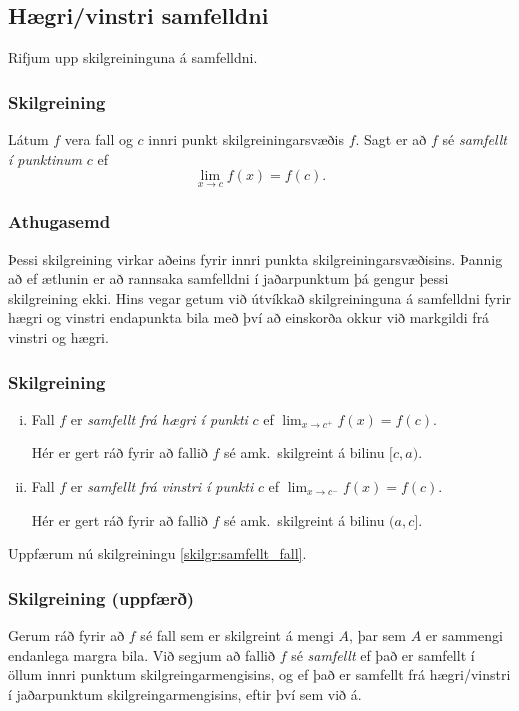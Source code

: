 \documentclass[icelandic,a4paper,12pt]{article}
\begin{document}
\subsection{Hægri/vinstri samfelldni}	
Rifjum upp skilgreininguna á samfelldni.
\subsubsection{Skilgreining}
Látum $f$ vera fall og $c$ innri punkt skilgreiningarsvæðis $f$.  Sagt
er að $f$ sé \emph{samfellt í punktinum} $c$ ef
$$\lim_{x\rightarrow c}f(x)=f(c).$$
 
\pause
\subsubsection{Athugasemd}
Þessi skilgreining virkar aðeins fyrir innri punkta skilgreiningarsvæðisins.
Þannig að ef ætlunin er að rannsaka samfelldni í jaðarpunktum þá gengur
þessi skilgreining ekki. Hins vegar getum við útvíkkað skilgreininguna á samfelldni fyrir 
hægri og vinstri endapunkta bila með því að einskorða okkur
við markgildi frá vinstri og hægri.

\subsubsection{Skilgreining}
\begin{enumerate}[(i)]
\item Fall $f$ er \emph{samfellt frá hægri í punkti} $c$ ef
$\lim_{x\rightarrow c^+}f(x)=f(c)$.
  
Hér er gert ráð fyrir að fallið $f$ sé amk.~skilgreint á bilinu $[c, a)$.
\pause
\item Fall $f$ er \emph{samfellt frá vinstri í punkti} $c$ ef
$\lim_{x\rightarrow c^-}f(x)=f(c)$.
  
Hér er gert ráð fyrir að fallið $f$ sé amk.~skilgreint á bilinu $(a, c]$.
\end{enumerate}

Uppfærum nú skilgreiningu \ref{skilgr:samfellt_fall}.
 \subsubsection{Skilgreining (uppfærð)}
 Gerum ráð fyrir að $f$ sé fall sem er skilgreint á
 mengi $A$, þar sem $A$ er sammengi endanlega margra bila.
 Við segjum að fallið $f$ sé \emph{samfellt} ef það er samfellt í 
 öllum innri punktum skilgreingarmengisins, og ef það er samfellt
 frá hægri/vinstri í jaðarpunktum skilgreingarmengisins,
 eftir því sem við á.
\end{document}
